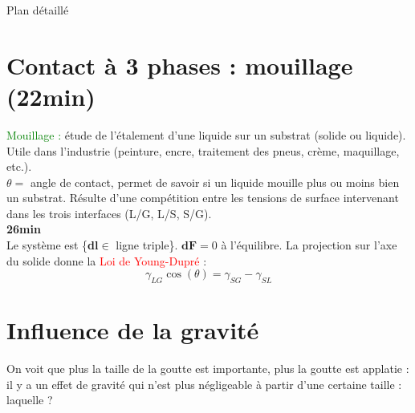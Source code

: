 \begin{reportBlock}{Plan détaillé}
  \section{Contact à 3 phases : mouillage (22min)}
  \textcolor{green}{Mouillage :} étude de l'étalement d'une liquide sur un substrat (solide ou liquide). Utile dans l'industrie (peinture, encre, traitement des pneus, crème, maquillage, etc.).\\
  $\theta =$ angle de contact, permet de savoir si un liquide mouille plus ou moins bien un substrat. Résulte d'une compétition entre les tensions de surface intervenant dans les trois interfaces (L/G, L/S, S/G). \\
  \textbf{26min}\\
  Le système est \{\textbf{dl}$\in$ ligne triple\}. 
  $\textbf{dF}=0$ à l'équilibre. La projection sur l'axe du solide donne la \textcolor{red}{Loi de Young-Dupré} :
  \begin{equation}
      \gamma_{LG}\cos(\theta) = \gamma_{SG}-\gamma_{SL}
  \end{equation}
  
  \section{Influence de la gravité}
  On voit que plus la taille de la goutte est importante, plus la goutte est applatie : il y a un effet de gravité qui n'est plus négligeable à partir d'une certaine taille : laquelle ?

\end{reportBlock}
